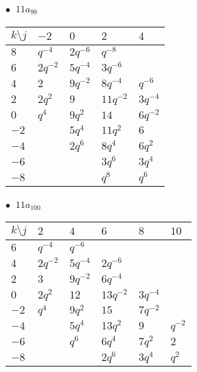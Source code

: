 \begin{minipage}{\linewidth}
$\bullet\ $ $11a_{99}$ \vspace{0.5em} \\
\begin{tabular}{l|llll}
$k \setminus j$ & $-2$ & $0$ & $2$ & $4$ \\
\hline
$8$ & $q^{-4}$ & $2q^{-6}$ & $q^{-8}$ &  \\
$6$ & $2q^{-2}$ & $5q^{-4}$ & $3q^{-6}$ &  \\
$4$ & $2$ & $9q^{-2}$ & $8q^{-4}$ & $q^{-6}$ \\
$2$ & $2q^{2}$ & $9$ & $11q^{-2}$ & $3q^{-4}$ \\
$0$ & $q^{4}$ & $9q^{2}$ & $14$ & $6q^{-2}$ \\
$-2$ &  & $5q^{4}$ & $11q^{2}$ & $6$ \\
$-4$ &  & $2q^{6}$ & $8q^{4}$ & $6q^{2}$ \\
$-6$ &  &  & $3q^{6}$ & $3q^{4}$ \\
$-8$ &  &  & $q^{8}$ & $q^{6}$ \\
\end{tabular}
\vspace{2em}
\end{minipage}
%
\begin{minipage}{\linewidth}
$\bullet\ $ $11a_{100}$ \vspace{0.5em} \\
\begin{tabular}{l|lllll}
$k \setminus j$ & $2$ & $4$ & $6$ & $8$ & $10$ \\
\hline
$6$ & $q^{-4}$ & $q^{-6}$ &  &  &  \\
$4$ & $2q^{-2}$ & $5q^{-4}$ & $2q^{-6}$ &  &  \\
$2$ & $3$ & $9q^{-2}$ & $6q^{-4}$ &  &  \\
$0$ & $2q^{2}$ & $12$ & $13q^{-2}$ & $3q^{-4}$ &  \\
$-2$ & $q^{4}$ & $9q^{2}$ & $15$ & $7q^{-2}$ &  \\
$-4$ &  & $5q^{4}$ & $13q^{2}$ & $9$ & $q^{-2}$ \\
$-6$ &  & $q^{6}$ & $6q^{4}$ & $7q^{2}$ & $2$ \\
$-8$ &  &  & $2q^{6}$ & $3q^{4}$ & $q^{2}$ \\
\end{tabular}
\vspace{2em}
\end{minipage}
%
